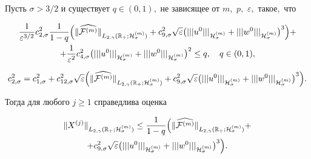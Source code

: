 \begin{theorem}[8]Пусть $\sigma>3/2$ и существует $q\in(0, 1),$ не зависящее от $m,$ $p,$ $\varepsilon,$ такое$,$ что

\begin{multline*}

\frac{1}{\varepsilon^{3/2}}c^2_{2,\sigma}\frac{1}{1-q}\Bigl(

\|\widehat{{\cal F}^{(m)}} \|_{L_{2,\gamma}(\mathbb R_{+};{\cal H}^{(m)}_{\sigma})}+

c_{9,\sigma}^2 \sqrt{\varepsilon} \bigl(|||u^0|||_{{\cal H}^{(m)}_\sigma}+|||w^0|||_{{\cal H}^{(m)}_\sigma}\bigr)^3\Bigr)+

\\

+\frac{1}{\varepsilon^2}c^2_{4,\sigma}

\bigl(|||u^0|||_{{\cal H}^{(m)}_\sigma}+|||w^0|||_{{\cal H}^{(m)}_\sigma}\bigr)^2\le q, \quad  q\in(0, 1),  

\end{multline*}

$$

c^2_{2,\sigma}=c^2_{1,\sigma}+c^2_{12,\sigma} \sqrt{\varepsilon}

\Bigl(\|\widehat{{\cal F}^{(m)}} \|_{L_{2,\gamma}(\mathbb R_{+};{\cal H}^{(m)}_{\sigma})}+

c_{9,\sigma}^2 \sqrt{\varepsilon} \bigl(|||u^0|||_{{\cal H}^{(m)}_\sigma}+|||w^0|||_{{\cal H}^{(m)}_\sigma}\bigr)^3\Bigr).

$$

Тогда для любого $j\ge 1$ справедлива оценка

\begin{multline*}

\|X^{(j)}\|_{L_{2,\gamma}(\mathbb R_{+};{\cal H}^{(m)}_{\sigma})} \le \frac{1}{1-q}\Bigl(\| \widehat{{\cal F}^{(m)}} \|_{L_{2,\gamma}(\mathbb R_{+};{\cal H}^{(m)}_{\sigma})}+

\\

+c_{9,\sigma}^2 \sqrt{\varepsilon} \bigl(|||u^0|||_{{\cal H}^{(m)}_\sigma}+|||w^0|||_{{\cal H}^{(m)}_\sigma}\bigr)^3\Bigr).

\end{multline*}

\end{theorem}



\smallskip



\hypertarget{dukh:th:9}{}



